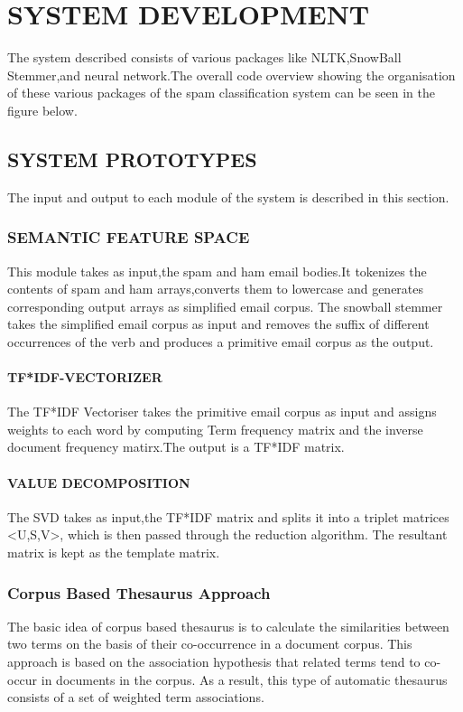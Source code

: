 
\chapter{SYSTEM DEVELOPMENT} %


The system described consists of various packages like NLTK,SnowBall Stemmer,and neural network.The overall code overview showing the 
organisation of these various packages of the spam classification system can be seen in the figure below.


\section{SYSTEM PROTOTYPES}

The input and output to each module of the system is described in
this section.

\subsection{SEMANTIC FEATURE SPACE}
This module takes as input,the spam and ham email bodies.It tokenizes the contents of spam and ham arrays,converts them to lowercase and generates corresponding output arrays as simplified email corpus. The snowball stemmer takes the simplified email corpus as input and removes the suffix of different occurrences of the verb and produces a primitive email corpus as the output.


\subsubsection{TF*IDF-VECTORIZER}  
The TF*IDF Vectoriser takes the primitive email corpus as input and assigns weights to each word by computing Term frequency matrix and the inverse document frequency matirx.The output is a TF*IDF matrix.
\subsubsection{VALUE DECOMPOSITION}
The SVD takes as input,the TF*IDF matrix and splits it into a triplet matrices <U,S,V>, which is then passed through the reduction algorithm. The resultant matrix is kept as the template matrix. 

\subsection{Corpus Based Thesaurus Approach}
The basic idea of corpus based thesaurus is to calculate the similarities between two terms on the basis of their co-occurrence in a document corpus. This approach is based on the association hypothesis that related terms tend to co-occur in documents in the corpus. As a result, this type of automatic thesaurus consists of a set of weighted term associations. 



